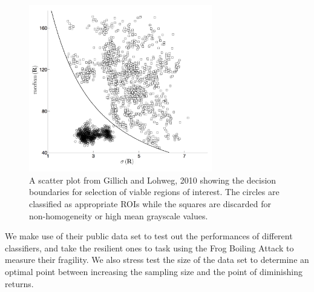 \documentclass{article}
\begin{document}
\begin{figure}
  \caption{A scatter plot from Gillich and Lohweg, 2010 showing the decision boundaries for selection of viable regions of interest. The circles are classified as appropriate ROIs while the squares are discarded for non-homogeneity or high mean grayscale values.}
  \centering
\includegraphics[width=80mm]{roi_selection.png}
\end{figure}
\newline\newline
We make use of their public data set to test out the performances of different classifiers, and take the resilient ones to task using the Frog Boiling Attack to measure their fragility. We also stress test the size of the data set to determine an optimal point between increasing the sampling size and the point of diminishing returns.
\end{document}
